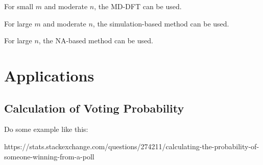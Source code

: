 \documentclass[12pt]{article}
\begin{document}
For small $m$ and moderate $n$, the MD-DFT can be used.

For large $m$ and moderate $n$, the simulation-based method can be used.

For large $n$, the NA-based method can be used.

\section{Applications}
\subsection{Calculation of Voting Probability}


Do some example like this:

https://stats.stackexchange.com/questions/274211/calculating-the-probability-of-someone-winning-from-a-poll




\end{document}
